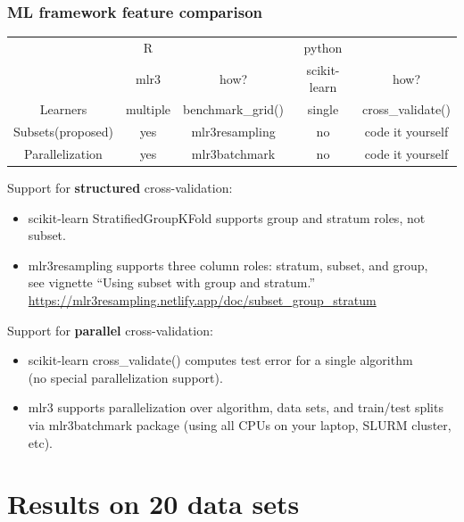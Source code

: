 \documentclass[t,aspectratio=1610]{beamer}
\begin{document}
\begin{frame}[fragile]
  \frametitle{ML framework feature comparison}

  \begin{tabular}{ccccc}
     & R& & python   \\
     & mlr3& how? &  scikit-learn & how?\\
    \hline
    Learners & multiple & benchmark\_grid() & single & cross\_validate() \\
    Subsets(proposed) & yes & mlr3resampling & no & code it yourself \\
    Parallelization & yes & mlr3batchmark & no & code it yourself   \\
  \end{tabular}

Support for \textbf{structured} cross-validation:
  \begin{itemize}
  \item 
    scikit-learn StratifiedGroupKFold
  supports group and stratum roles, not subset.
  \item
    mlr3resampling supports three column roles: stratum, subset, and group,\\see vignette ``Using subset with group and stratum.''
    \url{https://mlr3resampling.netlify.app/doc/subset_group_stratum}
  \end{itemize}
  Support for \textbf{parallel} cross-validation:
  \begin{itemize}
  \item scikit-learn cross\_validate() computes test error for a single algorithm\\
    (no special parallelization support).
  \item mlr3 supports parallelization over algorithm, data sets, and
    train/test splits via mlr3batchmark package (using all CPUs on your laptop, SLURM cluster, etc).
  \end{itemize}
\end{frame}
\section{Results on 20 data sets}
\end{document}
